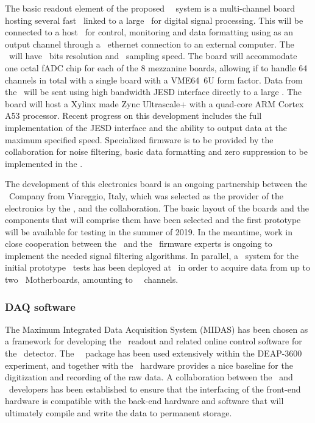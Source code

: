 The basic readout element of the proposed \DSks\ \DAQ\ system is a multi-channel board hosting several fast \ADCs\ linked to a large \FPGA\ for digital signal processing.  This will be connected to a host \CPU\ for control, monitoring and data formatting using as an output channel through a \DSkDAQEthernetRate\ ethernet connection to an external computer.  The \ADC\ will have \DSkDAQADCBits\ bits resolution and \DSkDAQADCSamplingRate\ sampling speed.  The board will accommodate one octal fADC chip for each of the \num{8} mezzanine boards, allowing if to handle 64 channels in total with a single board with a VME64~6U form factor.  Data from the \ADCs\ will be sent using high bandwidth JESD interface directly to a large \FPGA.  The board will host a Xylinx made Zync Ultrascale+ with a quad-core ARM Cortex A53 processor.  Recent progress on this development includes the full implementation of the JESD interface and the ability to output data at the maximum specified speed.  Specialized firmware is to be provided by the collaboration for noise filtering, basic data formatting and zero suppression to be implemented in the \FPGA.

The development of this electronics board is an ongoing partnership between  the \CAEN\ Company from Viareggio, Italy, which was selected as the provider of the electronics by the \INFN, and the collaboration.  The basic layout of the boards and the components that will comprise them have been selected and the first prototype will be available for testing in the summer of 2019.  In the meantime, work in close cooperation between the \GADMC\ and the \CAEN\ firmware experts is ongoing to implement the needed signal filtering algorithms.  In parallel, a \DAQ\ system for the initial prototype \TPC\ tests has been deployed at \CERN\ in order to acquire data from up to two \DSkPdm\ Motherboards, amounting to \DSpZeroPdmsNumber\ \DSkPdm\ channels.


\subsubsection{DAQ software}

The Maximum Integrated Data Acquisition System (MIDAS) has been chosen as a framework for developing the \DAQ\ readout and related online control software for the \DSks\ detector.  The \MIDAS\ \DAQ\ package has been used extensively within the DEAP-3600 experiment, and together with the \CAEN\ hardware provides a nice baseline for the digitization and recording of the raw data. A collaboration between the \MIDAS\ and \CAEN\ developers has been established to ensure that the interfacing of the front-end hardware is compatible with the back-end hardware and software that will ultimately compile and write the data to permanent storage.

